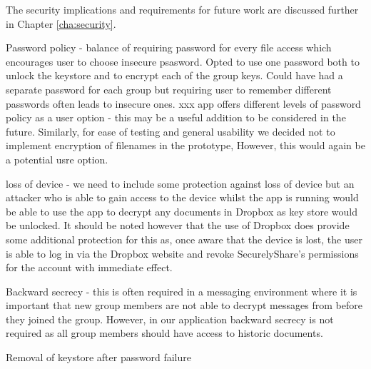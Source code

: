  The security implications and requirements for future work are discussed further in Chapter \ref{cha:security}.
 
Password policy - balance of requiring password for every file access which encourages user to choose insecure psasword.  Opted to use one password both to unlock the keystore and to encrypt each of the group keys.  Could have had a separate password for each group but requiring user to remember different passwords often leads to insecure ones.  xxx app offers different levels of password policy as a user option - this may be a useful addition to be considered in the future.   Similarly, for ease of testing and general usability we decided not to implement encryption of filenames in the prototype,  However, this would again be a potential usre option.
 
 loss of device - we need to include some protection against loss of device but an attacker who is able to gain access to the device whilst the app is running would be able to use the app to decrypt any documents in Dropbox as key store would be unlocked.  It should be noted however that the use of Dropbox does provide some additional protection for this as, once aware that the device is lost, the user is able to log in via the Dropbox website and revoke SecurelyShare's permissions for the account with immediate effect. 
 
Backward secrecy  - this is often required in a messaging environment where it is important that new group members are not able to decrypt messages from before they joined the group. However, in our application backward secrecy is not required as all group members should have access to historic documents.


Removal of keystore after password failure
 

